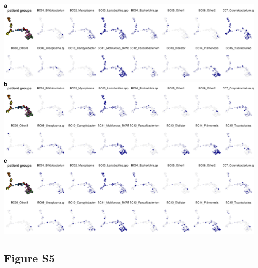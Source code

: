 \documentclass[
]{article}
\begin{document}
\includegraphics[width=1\linewidth]{manuscript_template_files/figure-latex/unnamed-chunk-11-1}
\includegraphics[width=1\linewidth]{manuscript_template_files/figure-latex/unnamed-chunk-11-2}
\includegraphics[width=1\linewidth]{manuscript_template_files/figure-latex/unnamed-chunk-11-3}

\clearpage

\hypertarget{figure-s5}{%
\subsection{Figure S5}\label{figure-s5}}
\end{document}
